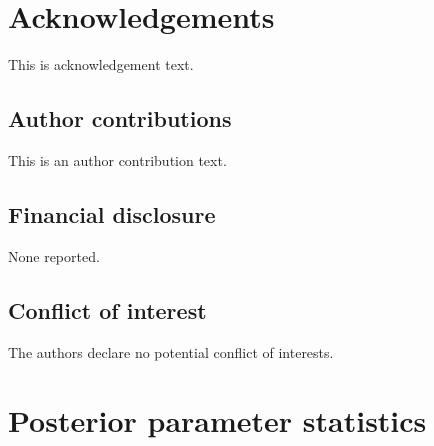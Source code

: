 \documentclass[AMA,STIX1COL]{WileyNJD-v2}
\begin{document}

\section*{Acknowledgements}
This is acknowledgement text.

\subsection*{Author contributions}

This is an author contribution text.

\subsection*{Financial disclosure}

None reported.

\subsection*{Conflict of interest}

The authors declare no potential conflict of interests.




\appendix

\section{Posterior parameter statistics \label{app1}}
\end{document}
